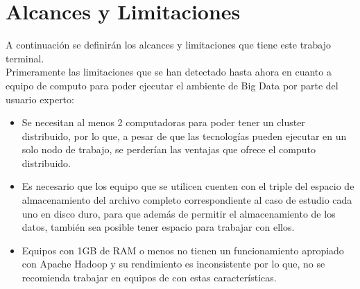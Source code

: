 \section{Alcances y Limitaciones}
A continuación se definirán los alcances y limitaciones que tiene este trabajo terminal.
\\ 
Primeramente las limitaciones que se han detectado hasta ahora en cuanto a equipo de computo para poder ejecutar el ambiente de Big Data por parte del usuario experto:
\begin{itemize}
	\item Se necesitan al menos 2 computadoras para poder tener un cluster distribuido, por lo que, a pesar de que las tecnologías pueden ejecutar en un solo nodo de trabajo, se perderían las ventajas que ofrece el computo distribuido.
	\item Es necesario que los equipo que se utilicen cuenten con el triple del espacio de almacenamiento del archivo completo correspondiente al caso de estudio cada uno en disco duro, para que además de permitir el almacenamiento de los datos, también sea posible tener espacio para trabajar con ellos.
	\item Equipos con 1GB de RAM o menos no tienen un funcionamiento apropiado con Apache Hadoop y su rendimiento es inconsistente por lo que, no se recomienda trabajar en equipos de con estas características.  
\end{itemize}

